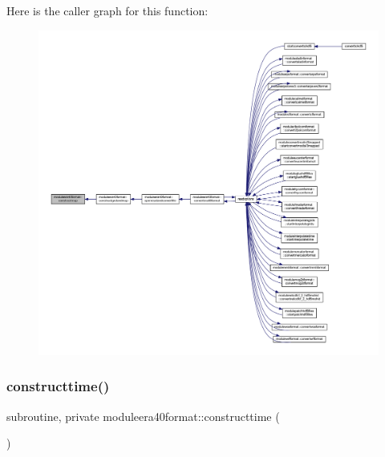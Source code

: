 Here is the caller graph for this function\+:\nopagebreak
\begin{figure}[H]
\begin{center}
\leavevmode
\includegraphics[width=350pt]{namespacemoduleera40format_a45bd99707035a442354f99cd2597f1e5_icgraph}
\end{center}
\end{figure}
\mbox{\label{namespacemoduleera40format_a866d19867c0e3bcef28981a8907ea516}} 
\subsubsection{\texorpdfstring{constructtime()}{constructtime()}}
{\footnotesize\ttfamily subroutine, private moduleera40format\+::constructtime (\begin{DoxyParamCaption}{ }\end{DoxyParamCaption})\hspace{0.3cm}{\ttfamily [private]}}

